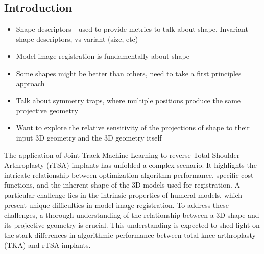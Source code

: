 \subsection{Introduction}

\begin{itemize}
  \item Shape descriptors - used to provide metrics to talk about shape. Invariant shape descriptors, vs variant (size, etc)
  \item Model image registration is fundamentally about shape
  \item Some shapes might be better than others, need to take a first principles approach
  \item Talk about symmetry traps, where multiple positions produce the same projective geometry
  \item Want to explore the relative sensitivity of the projections of shape to their input 3D geometry and the 3D geometry itself
\end{itemize}

The application of Joint Track Machine Learning to reverse Total Shoulder Arthroplasty (rTSA) implants has unfolded a complex scenario.
It highlights the intricate relationship between optimization algorithm performance, specific cost functions, and the inherent shape of the 3D models used for registration.
A particular challenge lies in the intrinsic properties of humeral models, which present unique difficulties in model-image registration.
To address these challenges, a thorough understanding of the relationship between a 3D shape and its projective geometry is crucial.
This understanding is expected to shed light on the stark differences in algorithmic performance between total knee arthroplasty (TKA) and rTSA implants.


